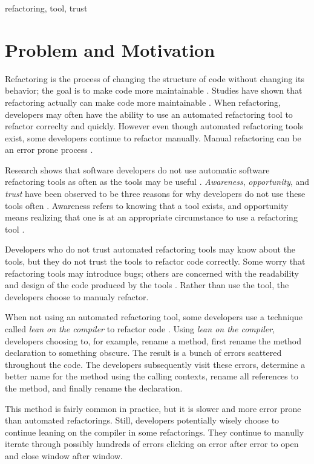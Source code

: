 \documentclass{sigplanconf}
\begin{document}
\keywords
refactoring, tool, trust

\section{Problem and Motivation}
Refactoring is the process of changing the structure of code without changing
its behavior; the goal is to make code more maintainable \cite{legacy-code}.
Studies have shown that refactoring actually can make code more maintainable
\cite{maintainability}. When refactoring, developers may often have the
ability to use an automated refactoring tool to refactor correclty and quickly.
However even though automated refactoring tools exist, some developers continue
to refactor manually. Manual refactoring can be an error prone process
\cite{bene-factor}.

Research shows that software developers do not use automatic software
refactoring tools as often as the tools may be useful \cite{how-refactor}.
\textit{Awareness}, \textit{opportunity}, and
\textit{trust} have been observed to be three reasons for why developers do not
use these tools often \cite{how-refactor, say-refactor}. Awareness refers to
knowing that a tool exists, and opportunity means realizing that one is at an
appropriate circumstance to use a refactoring tool \cite{how-refactor}.

Developers who do not trust automated refactoring
tools may know about the tools, but they do not trust the tools to refactor code
correctly. Some worry that refactoring tools may introduce bugs; others
are concerned with the readability and design of the code produced by the
tools \cite{say-refactor}.
Rather than use the tool, the developers choose to manualy refactor.

When not using an automated refactoring tool, some developers use a technique
called \textit{lean on the compiler} to refactor
code \cite{legacy-code, how-refactor}. Using \textit{lean on the compiler},
developers choosing to, for example, rename a method, first rename the method
declaration to something obscure. The result
is a bunch of errors scattered throughout the code. The developers subsequently
visit these errors, determine a better name for the method using the calling
contexts, rename all references to the method, and finally rename the
declaration.

This method is fairly common in practice\cite{1}, but it is slower and more
error prone than automated refactorings. Still, developers potentially 
wisely choose to continue leaning on the compiler in some refactorings.
They continue to manully iterate through possibly hundreds of errors
clicking on error after error to open and close window after window.
\end{document}
